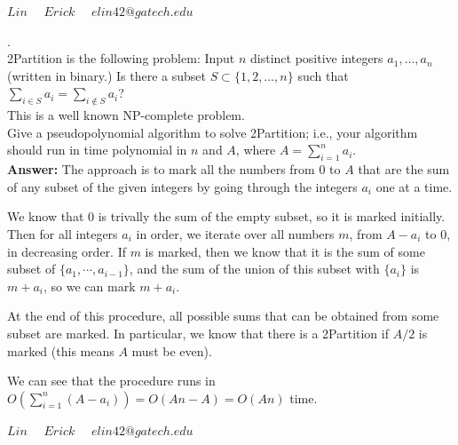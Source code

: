 \documentclass[a4paper,11pt]{article}
\begin{document}
\pagebreak 

 $Lin \quad$
 $Erick \quad$
          $elin42@gatech.edu$\\

\bigskip
{}.  \\
2Partition is the following problem: Input $n$ distinct positive integers $a_1, \ldots , a_n$ (written in binary.)
Is there a subset $S \subset \{ 1 , 2 , \ldots , n \}$ such that $\sum_{i\in S} a_i  = \sum_{i \not\in S} a_i$? \\
This is a well known NP-complete problem. \\
Give a pseudopolynomial algorithm to solve 2Partition; i.e., your algorithm should run in time polynomial 
in $n$ and $A$, where $A=\sum_{i=1}^{n} a_i$.\\

\noindent
{\bf Answer:}
The approach is to mark all the numbers from $0$ to $A$ that are the sum of any subset of the given integers by going through the integers $a_i$ one at a time. \par
We know that $0$ is trivally the sum of the empty subset, so it is marked initially. Then for all integers $a_i$ in order, we iterate over all numbers $m$, from $A - a_i$ to $0$, in decreasing order. If $m$ is marked, then we know that it is the sum of some subset of $\{ a_1, \cdots, a_{i - 1} \}$, and the sum of the union of this subset with $\{ a_i \}$ is $m + a_i$, so we can mark $m + a_i$. \par
At the end of this procedure, all possible sums that can be obtained from some subset are marked. In particular, we know that there is a 2Partition if $A/2$ is marked (this means $A$ must be even). \par
We can see that the procedure runs in $O(\sum_{i = 1}^n (A - a_i)) = O(An - A) = O(An)$ time.


\pagebreak

 $Lin \quad$
 $Erick \quad$
          $elin42@gatech.edu$\\
\end{document}
